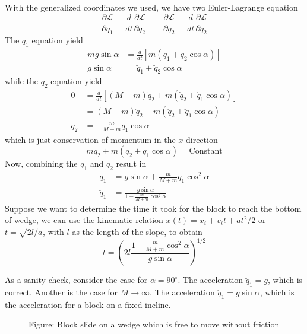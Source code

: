 \documentclass[../../../main.tex]{subfiles}
\begin{document}
With the generalized coordinates we used, we have two Euler-Lagrange equation
\begin{equation*}
    \frac{\partial \mathcal{L}}{\partial q_1}=\frac{d}{dt}\frac{\partial \mathcal{L}}{\partial \dot{q}_2}\qquad\frac{\partial \mathcal{L}}{\partial q_2}=\frac{d}{dt}\frac{\partial \mathcal{L}}{\partial \dot{q}_2}
\end{equation*}
The $q_1$ equation yield 
\begin{align*}
    mg\sin\alpha&=\frac{d}{dt}\left[m(\dot{q}_1+\dot{q}_2\cos\alpha)\right]\\
    g\sin\alpha&=\ddot{q}_1+\ddot{q}_2\cos\alpha
\end{align*}
while the $q_2$ equation yield
\begin{align*}
    0&=\frac{d}{dt}\left[(M+m)\dot{q}_2+m(\dot{q}_2+\dot{q}_1\cos\alpha)\right]\\
    &=(M+m)\ddot{q}_2+m(\ddot{q}_2+\ddot{q}_1\cos\alpha)\\
    \ddot{q}_2&=-\frac{m}{M+m}\ddot{q}_1\cos\alpha
\end{align*}
which is just conservation of momentum in the $x$ direction
\begin{equation*}
    m\dot{q}_2+m\left(\dot{q_2}+\dot{q}_1\cos\alpha\right)=\text{Constant}
\end{equation*}
Now, combining the $q_1$ and $q_2$ result in 
\begin{align*}
    \ddot{q}_1&=g\sin\alpha+\frac{m}{M+m}\ddot{q}_1\cos^2\alpha\\
    \ddot{q}_1&=\frac{g\sin\alpha}{1-\frac{m}{M+m}\cos^2\alpha}
\end{align*}
Suppose we want to determine the time it took for the block to reach the bottom of wedge, we can use the kinematic relation $x(t)=x_i+v_it+at^2/2$ or $t=\sqrt{2l/a}$, with $l$ as the length of the slope, to obtain
\begin{equation*}
    t=\left(2l\frac{1-\frac{m}{M+m}\cos^2\alpha}{g\sin\alpha}\right)^{1/2}
\end{equation*}

As a sanity check, consider the case for $\alpha=90^\circ$. 
The acceleration $\ddot{q}_1=g$, which is correct.
Another is the case for $M\rightarrow\infty$. 
The acceleration $\ddot{q}_1=g\sin\alpha$, which is the acceleration for a block on a fixed incline.  

\begin{figure*}
    \centering
    \caption*{Figure: Block slide on a wedge which is free to move without friction}
\end{figure*}
\end{document}
